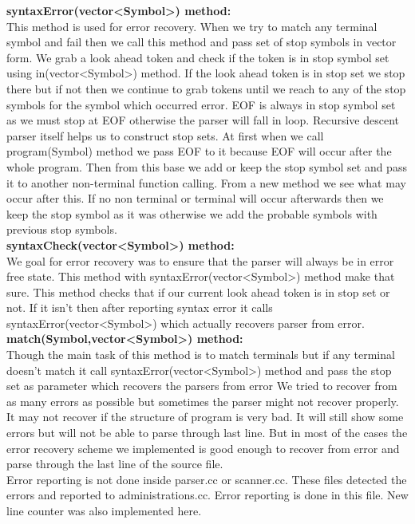 \documentclass[paper=letter, fontsize=12pt]{scrartcl} %
\begin{document}
{\bf syntaxError(vector<Symbol>) method:}\\
This method is used for error recovery. When we try to match any terminal symbol and fail then we call this method and pass set of stop symbols in vector form. We grab a look ahead token and check if the token is in stop symbol set using in(vector<Symbol>) method. If the look ahead token is in stop set we stop there but if not then we continue to grab tokens until we reach to any of the stop symbols for the symbol which occurred error. EOF is always in stop symbol set as we must stop at EOF otherwise the parser will fall in loop. Recursive descent parser itself helps us to construct stop sets. At first when we call program(Symbol) method we pass EOF to it because EOF will occur after the whole program. Then from this base we add or keep the stop symbol set and pass it to another non-terminal function calling. From a new method we see what may occur after this. If no non terminal or terminal will occur afterwards then we keep the stop symbol as it was otherwise we add the probable symbols with previous stop symbols. \\

{\bf syntaxCheck(vector<Symbol>) method:}\\
We goal for error recovery was to ensure that the parser will always be in error free state. This method with syntaxError(vector<Symbol>) method make that sure. This method checks that if our current look ahead token is in stop set or not. If it isn't then after reporting syntax error it calls syntaxError(vector<Symbol>) which actually recovers parser from error.\\ 

{\bf match(Symbol,vector<Symbol>) method:}\\
Though the main task of this method is to match terminals but if any terminal doesn't match it call syntaxError(vector<Symbol>) method and pass the stop set as parameter which recovers the parsers from error		
We tried to recover from as many errors as possible but sometimes the parser might not recover properly. It may not recover if the structure of program is very bad. It will still show some errors but will not be able to parse through last line. But in most of the cases the error recovery scheme we implemented is good enough to recover from error and parse through the last line of the source file.\\

Error reporting is not done inside parser.cc or scanner.cc. These files detected the errors and reported to administrations.cc. Error reporting is done in this file. New line counter was also implemented here.\\
\end{document}
